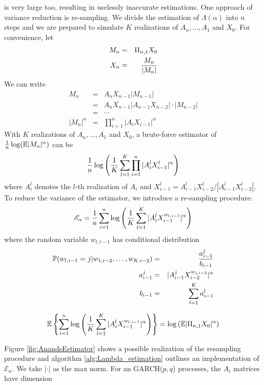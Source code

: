 is very large too, resulting in uselessly inaccurate estimations. One
approach of variance reduction is re-sampling. We divide the
estimation of $\Lambda(\alpha)$ into $n$ steps and we are prepared to
simulate $K$ realizations of $A_n, \dots, A_1$ and $X_0$. For
convenience, let
\begin{eqnarray*}
  M_n &=& \Pi_{n, 1} X_0 \\
  X_n &=& {M_n \over |M_n|}
\end{eqnarray*}
We can write
\begin{eqnarray*}
  M_n &=& A_n X_{n - 1} |M_{n - 1}| \\
  &=& A_n X_{n - 1} |A_{n-1} X_{n-2}| \cdot |M_{n-2}| \\
  &=& \cdots \\
  |M_n|^\alpha &=& \prod_{i=1}^n |A_i X_{i-1}|^\alpha
\end{eqnarray*}
With $K$ realizations of $A_n, \dots, A_1$ and $X_0$, a brute-force
estimator of ${1 \over n} \log(\E |M_n|^\alpha)$ can be
\[
{1 \over n} \log \left(
  {1 \over K} \sum_{l=1}^K \prod_{i=1}^n |A_i^l X^l_{i-1}|^\alpha
\right)
\]
where $A_i^l$ denotes the $l$-th realization of $A_i$ and
$X^l_{i-1} = A_{i-1}^l X^l_{i-2}/|A_{i-1}^l X^l_{i-2}|$. To reduce the
variance of the estimator, we introduce a re-sampling procedure:
\begin{equation}
  \label{eq:AnandsEstimator}
  \mathscr E_\alpha =
  {1 \over n}
  \sum_{i=1}^n \log \left(
    {1 \over K}\sum_{l=1}^K |A_i^l X^{w_{l, i-1}}_{i-1}|^\alpha
  \right)
\end{equation}
where the random variable $w_{l, i-1}$ has conditional distribution
\begin{eqnarray*}
  \P(w_{l, i-1} = j | w_{1, i-2}, \dots, w_{K, i-2}) &=& {a^j_{i-1} \over b_{i-1}} \\
  a_{i-1}^j &=& |A_{i-1}^j X_{i-2}^{w_{j, i-2}}|^\alpha \\
  b_{i-1} &=& \sum_{l=1}^K a_{i-1}^l
\end{eqnarray*}
\begin{theorem}
  \[
  \E \left\{
    \sum_{i=1}^n \log \left(
      {1 \over K}\sum_{l=1}^K |A_i^l X^{w_{l, i-1}}_{i-1}|^\alpha
    \right)
  \right\} = \log \left(
    \E |\Pi_{n, 1} X_0|^\alpha
  \right)
  \]
\end{theorem}
Figure \ref{fig:AnandsEstimator} shows a possible realization of the
resampling procedure and algorithm \ref{alg:Lambda_estimation}
outlines an implementation of $\mathscr E_\alpha$. We take
$|\cdot|$ as the max norm.
For an GARCH($p, q$) processes, the $A_i$ matrices have dimension
